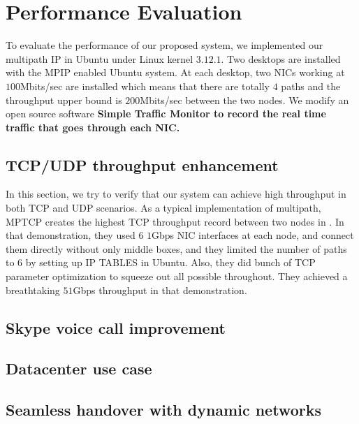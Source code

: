 \section{Performance Evaluation}
\label{sec:evaluation}
To evaluate the performance of our proposed system, we implemented our multipath IP in Ubuntu under Linux kernel $3.12.1$. Two desktops are installed with the MPIP enabled Ubuntu system. At each desktop, two NICs working at $100$Mbits/sec are installed which means that there are totally $4$ paths and the throughput upper bound is $200$Mbits/sec between the two nodes. We modify an open source software \bf{Simple Traffic Monitor}\cite{simon01} to record the real time traffic that goes through each NIC.


\subsection{TCP/UDP throughput enhancement}
\label{sec:tcp}

In this section, we try to verify that our system can achieve high throughput in both TCP and UDP scenarios. As a typical implementation of multipath, MPTCP creates the highest TCP throughput record between two nodes in \cite{record}. In that demonstration, they used $6$ $1$Gbps NIC interfaces at each node, and connect them directly without only middle boxes, and they limited the number of paths to $6$ by setting up IP TABLES in Ubuntu. Also, they did bunch of TCP parameter optimization to squeeze out all possible throughout. They achieved a breathtaking $51$Gbps throughput in that demonstration. 

\subsection{Skype voice call improvement}
\label{sec:skype}

\subsection{Datacenter use case}
\label{sec:datacenter}

\subsection{Seamless handover with dynamic networks}
\label{sec:handover}
